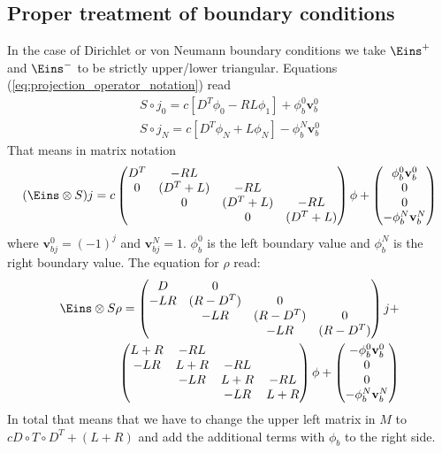 \documentclass[a4paper,12pt]{scrartcl}
\renewcommand{\vec}[1]{{\mathbf{#1}}}
\begin{document}
\subsection{Proper treatment of boundary conditions}
In the case of Dirichlet or von Neumann boundary conditions we take $\Eins^+$ and
$\Eins^-$ to be strictly upper/lower triangular. Equations (\ref{eq:projection_operator_notation}) read
\begin{subequations}
    \begin{align}
        S\circ j_0 = c[ D^T\phi_0 - RL\phi_1] + \phi_b^0 \vec v_b^0 \\
        S\circ j_N = c[ D^T\phi_N + L\phi_N] - \phi_b^N \vec v_b^0 
    \end{align}
    \label{eq:dirichlet}
\end{subequations}
That means in matrix notation 
\begin{align}
    (\Eins\otimes S) j = c\begin{pmatrix}
        D^T & -RL & &  \\
          0 & (D^T + L) & -RL & \\
            &0& (D^T + L) & -RL \\
            & &0& (D^T + L)  
    \end{pmatrix}
    \phi + 
    \begin{pmatrix}
        \phi_b^0 \vec v_b^0 \\
        0\\
        0\\
        -\phi_b^N \vec v_b^N
    \end{pmatrix}
    \label{}
\end{align}
where $\vec v_{bj}^0 = (-1)^j$ and $\vec v_{bj}^N = 1$. $\phi_b^0$ is the 
left boundary value and $\phi_b^N$ is the right boundary value.
The equation for $\rho$ read:
\begin{align}
    \Eins\otimes S \rho = 
    \begin{pmatrix}
        D &0 & &\\
        -LR & (R-D^T) &0 & \\
            & -LR & (R-D^T) &0\\
            & & -LR & (R-D^T)
    \end{pmatrix}j+\nonumber \\
    \begin{pmatrix}
        L+R & -RL & &\\
        -LR & L+R & -RL&\\
            & -LR & L+R & -RL\\
            & & -LR & L+R
    \end{pmatrix}\phi +
    \begin{pmatrix}
        -\phi_b^0 \vec v_b^0 \\
        0\\
        0\\
        -\phi_b^N \vec v_b^N
    \end{pmatrix}
    \label{}
\end{align}
In total that means that we have to change the upper left 
matrix in $M$ to $cD\circ T \circ D^T + (L+R)$ and add the additional terms 
with $\phi_b$ to the right side. 
\end{document}

